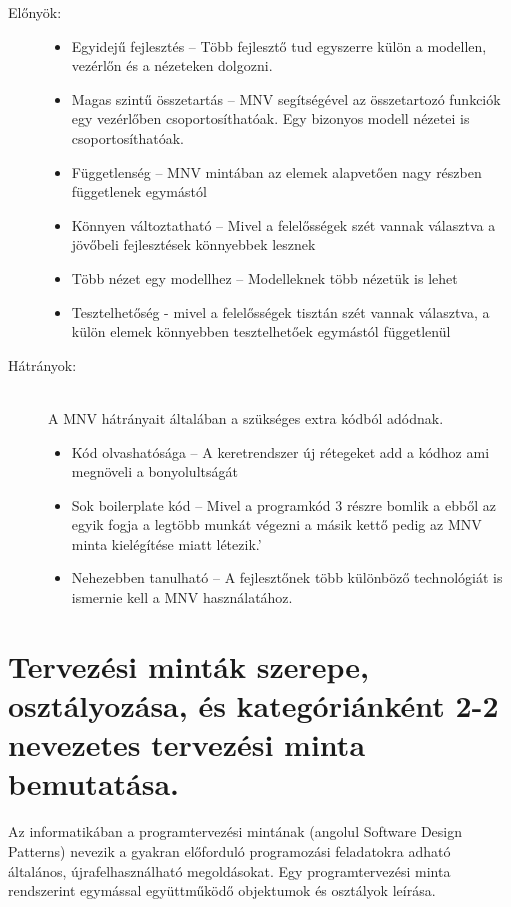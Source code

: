 \documentclass[margin=0px]{article}
\begin{document}
\begin{description}
    \item[Előnyök:] \hfill
        \begin{itemize}
            \item Egyidejű fejlesztés – Több fejlesztő tud egyszerre külön a modellen, vezérlőn és a nézeteken dolgozni.
            \item Magas szintű összetartás – MNV segítségével az összetartozó funkciók egy vezérlőben csoportosíthatóak. Egy bizonyos modell nézetei is csoportosíthatóak.
            \item Függetlenség – MNV mintában az elemek alapvetően nagy részben függetlenek egymástól
            \item Könnyen változtatható – Mivel a felelősségek szét vannak választva a jövőbeli fejlesztések könnyebbek lesznek
            \item Több nézet egy modellhez – Modelleknek több nézetük is lehet
            \item Tesztelhetőség - mivel a felelősségek tisztán szét vannak választva, a külön elemek könnyebben tesztelhetőek egymástól függetlenül
        \end{itemize}
    \item[Hátrányok:] \hfill \\
        A MNV hátrányait általában a szükséges extra kódból adódnak.
        \begin{itemize}
            \item Kód olvashatósága – A keretrendszer új rétegeket add a kódhoz ami megnöveli a bonyolultságát
            \item Sok boilerplate kód – Mivel a programkód 3 részre bomlik a ebből az egyik fogja a legtöbb munkát végezni a másik kettő pedig az MNV minta kielégítése miatt létezik.'
            \item Nehezebben tanulható – A fejlesztőnek több különböző technológiát is ismernie kell a MNV használatához.
        \end{itemize}
\end{description}

\section{Tervezési minták szerepe, osztályozása, és kategóriánként 2-2 nevezetes tervezési minta bemutatása.}
Az informatikában a programtervezési mintának (angolul Software Design Patterns) nevezik a gyakran előforduló programozási feladatokra adható általános, újrafelhasználható megoldásokat. Egy programtervezési minta rendszerint egymással együttműködő objektumok és osztályok leírása.
\end{document}
